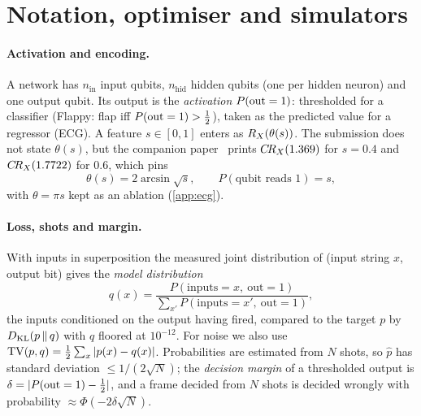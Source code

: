 \section{Notation, optimiser and simulators}
\label{app:notation}

\paragraph{Activation and encoding.}
A network has $n_{\mathrm{in}}$ input qubits, $n_{\mathrm{hid}}$ hidden qubits (one per hidden
neuron) and one output qubit.  Its output is the \emph{activation} $P(\mathrm{out}=1)$: thresholded for a
classifier (Flappy: flap iff $P(\mathrm{out}=1)>\tfrac12$), taken as the predicted value for a regressor
(ECG).  A feature $s\in[0,1]$ enters as $R_X(\theta(s))$.  The submission does not state
$\theta(s)$, but the companion paper~\cite{rosenhahn2026stochasticneuralnetworksquantum} prints
$C\!R_X(1.369)$ for $s=0.4$ and $C\!R_X(1.7722)$ for $0.6$, which pins
\begin{equation}
\theta(s) = 2\arcsin\sqrt{s}, \qquad P(\text{qubit reads }1) = s ,
\label{eq:agentic-encoding}
\end{equation}
with $\theta=\pi s$ kept as an ablation (\cref{app:ecg}).

\paragraph{Loss, shots and margin.}
With inputs in superposition the measured joint distribution of (input string $x$, output bit)
gives the \emph{model distribution}
\begin{equation}
q(x) = \frac{P(\text{inputs}=x,\ \mathrm{out}=1)}
            {\sum_{x'} P(\text{inputs}=x',\ \mathrm{out}=1)} ,
\label{eq:agentic-model}
\end{equation}
the inputs conditioned on the output having fired, compared to the target $p$ by
$D_{\mathrm{KL}}(p\,\|\,q)$ with $q$ floored at $10^{-12}$.  For noise we also use
$\mathrm{TV}(p,q)=\tfrac12\sum_x|p(x)-q(x)|$.  Probabilities are estimated from $N$ shots, so $\hat p$
has standard deviation $\le1/(2\sqrt N)$; the \emph{decision margin} of a thresholded output is
$\delta=|P(\mathrm{out}=1)-\tfrac12|$, and a frame decided from $N$ shots is decided wrongly with
probability $\approx\Phi(-2\delta\sqrt N)$.

